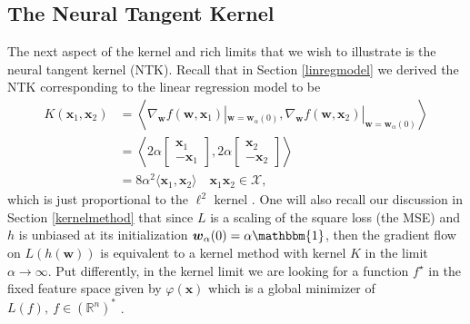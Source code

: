 \documentclass{article}
\begin{document}
\subsection{The Neural Tangent Kernel}\label{visualizeNTK}

The next aspect of the kernel and rich limits that we wish to illustrate is the neural tangent kernel (NTK). Recall that in Section \ref{linregmodel} we derived the NTK corresponding to the linear regression model to be
\begin{align*}
K(\boldsymbol{x}_1, \boldsymbol{x}_2) &= \left\langle \nabla_{\boldsymbol{w}}f(\boldsymbol{w}, \boldsymbol{x}_1)|_{\boldsymbol{w} = \boldsymbol{w}_{\alpha}(0)}, \nabla_{\boldsymbol{w}}f(\boldsymbol{w}, \boldsymbol{x}_2)|_{\boldsymbol{w} = \boldsymbol{w}_{\alpha}(0)} \right\rangle\\
&= \left\langle 2\alpha 
    \begin{bmatrix}
        \boldsymbol{x}_1\\
        -\boldsymbol{x}_1
    \end{bmatrix}, 2\alpha 
    \begin{bmatrix}
        \boldsymbol{x}_2\\
        -\boldsymbol{x}_2
    \end{bmatrix} \right\rangle\\
&= 8\alpha^2 \langle \boldsymbol{x}_1, \boldsymbol{x}_2 \rangle \quad \boldsymbol{x}_1 \boldsymbol{x}_2 \in \mathcal{X},
\end{align*}
which is just proportional to the $\ell^2$ kernel \cite{woodworth2020kernel}. One will also recall our discussion in Section \ref{kernelmethod} that since $L$ is a scaling of the square loss (the MSE) and $h$ is unbiased at its initialization $\boldsymbol{w}_{\alpha}(0) = \alpha \mathbbm{1}$, then the gradient flow on $L(h(\boldsymbol{w}))$ is equivalent to a kernel method with kernel $K$ in the limit $\alpha \rightarrow \infty$. Put differently, in the kernel limit we are looking for a function $f^{\star}$ in the fixed feature space given by $\varphi(\boldsymbol{x})$ which is a global minimizer of $L(f), \ f \in (\mathbb{R}^n)^*$ \cite{wei2019regularization}.
\end{document}
